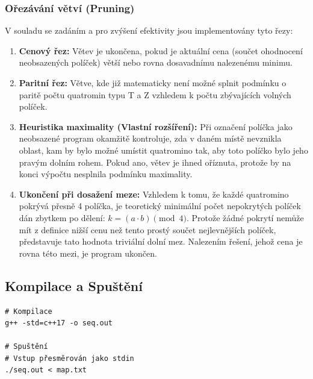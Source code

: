 \documentclass[11pt,a4paper]{article}
\begin{document}
\subsubsection{Ořezávání větví (Pruning)}
V souladu se zadáním a pro zvýšení efektivity jsou implementovány tyto řezy:
\begin{enumerate}
    \item \textbf{Cenový řez:} Větev je ukončena, pokud je aktuální cena (součet ohodnocení neobsazených políček) větší nebo rovna dosavadnímu nalezenému minimu.
    \item \textbf{Paritní řez:} Větve, kde již matematicky není možné splnit podmínku o paritě počtu quatromin typu T a Z vzhledem k počtu zbývajících volných políček.
    \item \textbf{Heuristika maximality (Vlastní rozšíření):} Při označení políčka jako neobsazené program okamžitě kontroluje, zda v daném místě nevznikla oblast, kam by bylo možné umístit quatromino tak, aby toto políčko bylo jeho pravým dolním rohem. Pokud ano, větev je ihned oříznuta, protože by na konci výpočtu nesplnila podmínku maximality.
    \item \textbf{Ukončení při dosažení meze:} Vzhledem k tomu, že každé quatromino pokrývá přesně 4 políčka, je teoretický minimální počet nepokrytých políček dán zbytkem po dělení: $k = (a \cdot b) \pmod 4$. Protože žádné pokrytí nemůže mít z definice nižší cenu než tento prostý součet nejlevnějších políček, představuje tato hodnota triviální dolní mez. Nalezením řešení, jehož cena je rovna této mezi, je program ukončen.
\end{enumerate}


\subsection{Kompilace a Spuštění}

\begin{verbatim}
# Kompilace
g++ -std=c++17 -o seq.out

# Spuštění
# Vstup přesměrován jako stdin
./seq.out < map.txt
\end{verbatim}
\end{document}
